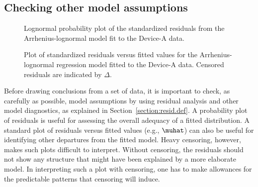 \subsection{Checking other model assumptions}
\begin{figure}
\caption{Lognormal probability plot of the standardized residuals
from the Arrhenius-lognormal model
fit to the Device-A data.}
\label{figure:devalt.residual.linear.lnor.ps}
\end{figure}
\begin{figure}
\caption{Plot of standardized residuals
versus fitted values for the Arrhenius-lognormal regression model
fitted to the Device-A data. Censored residuals are indicated by
$\Delta$.}
\label{figure:devalt.fitvsres.linear.lnor.ps}
\end{figure}
Before drawing conclusions from a set of data, it is important to
check, as carefully as possible, model assumptions by using residual
analysis and other model diagnostics, as explained in
Section~\ref{section:resid.def}. A probability plot of residuals is
useful for assessing the overall adequacy of a fitted distribution.
A standard plot of residuals versus fitted values (e.g., $\muhat$)
can also be useful for identifying other departures from the fitted
model. Heavy censoring, however, makes such plots difficult to
interpret. Without censoring, the residuals should not show any
structure that might have been explained by a more elaborate model.
In interpreting such a plot with censoring, one has to make
allowances for the predictable patterns that censoring will induce.

